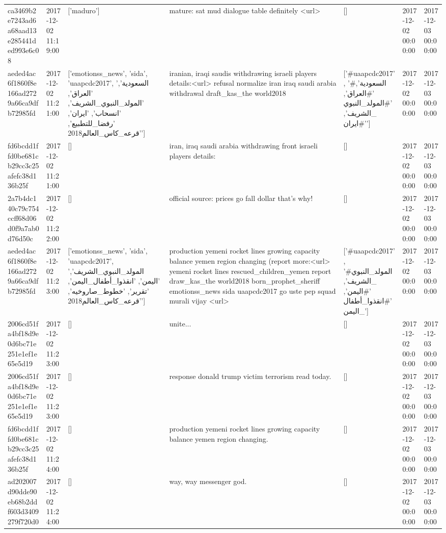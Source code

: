 \begin{tabular}{lllllll}
ca3469b2e7243ad6a68aad13e285441ded993e6c08 & 2017-12-02 11:19:00 & ['maduro'] & mature: sat mud dialogue table definitely <url> & [] & 2017-12-02 00:00:00 & 2017-12-03 00:00:00 \\
aeded4ac6f1860f8e166ad2729a66ca9dfb72985fd & 2017-12-02 11:21:00 & ['emotionss_news', 'sida', 'uaapcdc2017', 'السعودية', 'العراق', 'المولد_النبوي_الشريف', 'انسحاب', 'ايران', 'رفضا_للتطبيع', 'قرعه_كاس_العالم2018'] & iranian, iraqi saudis withdrawing israeli players details:<url> refusal normalize iran iraq saudi arabia withdrawal draft\_kas\_the world2018 & ['#uaapcdc2017', '#السعودية', '#العراق', '#المولد_النبوي_الشريف', '#ايران'] & 2017-12-02 00:00:00 & 2017-12-03 00:00:00 \\
fd6bcdd1ffd0be681cb29cc3c25afefc38d136b25f & 2017-12-02 11:21:00 & [] & iran, iraq saudi arabia withdrawing front israeli players details: & [] & 2017-12-02 00:00:00 & 2017-12-03 00:00:00 \\
2a7b4dc140c79c754ccff68d06d0f9a7ab0d76d50c & 2017-12-02 11:22:00 & [] & official source: prices go fall dollar that's why! & [] & 2017-12-02 00:00:00 & 2017-12-03 00:00:00 \\
aeded4ac6f1860f8e166ad2729a66ca9dfb72985fd & 2017-12-02 11:23:00 & ['emotionss_news', 'sida', 'uaapcdc2017', 'المولد_النبوي_الشريف', 'اليمن', 'انقذوا_أطفال_اليمن', 'تقرير', 'خطوط_صاروخيه', 'قرعه_كاس_العالم2018'] & production yemeni rocket lines growing capacity balance yemen region changing (report more:<url> yemeni rocket lines rescued\_children\_yemen report draw\_kas\_the world2018 born\_prophet\_sheriff emotionss\_news sida uaapcdc2017 go uste pep squad murali vijay <url> & ['#uaapcdc2017', '#المولد_النبوي_الشريف', '#اليمن', '#انقذوا_أطفال_اليمن'] & 2017-12-02 00:00:00 & 2017-12-03 00:00:00 \\
2006cd51fa4bf18d9e0d6bc71e251e1ef1e65e5d19 & 2017-12-02 11:23:00 & [] & unite... & [] & 2017-12-02 00:00:00 & 2017-12-03 00:00:00 \\
2006cd51fa4bf18d9e0d6bc71e251e1ef1e65e5d19 & 2017-12-02 11:23:00 & [] & response donald trump victim terrorism read today. & [] & 2017-12-02 00:00:00 & 2017-12-03 00:00:00 \\
fd6bcdd1ffd0be681cb29cc3c25afefc38d136b25f & 2017-12-02 11:24:00 & [] & production yemeni rocket lines growing capacity balance yemen region changing. & [] & 2017-12-02 00:00:00 & 2017-12-03 00:00:00 \\
ad202007d90dde90eb68b2ddf603d3409279f720d0 & 2017-12-02 11:24:00 & [] & way, way messenger god. & [] & 2017-12-02 00:00:00 & 2017-12-03 00:00:00 \\

\end{tabular}
